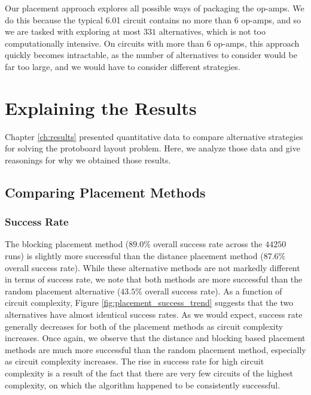 Our placement approach explores all possible ways
of packaging the op-amps. We do this because the typical 6.01 circuit contains
no more than $6$ op-amps, and so we are tasked with exploring at most $331$
alternatives, which is not too computationally intensive.
On circuits with more than $6$ op-amps, this approach quickly becomes
intractable, as the number of alternatives to consider would be
far too large, and we would have to consider different strategies.

\section{Explaining the Results}

Chapter \ref{ch:results} presented quantitative data to compare alternative
strategies for solving the protoboard layout problem. Here, we
analyze those data and give reasonings for why we obtained those results.

\subsection{Comparing Placement Methods}

\subsubsection{Success Rate}
The blocking placement method ($89.0\%$ overall success rate across the $44250$
runs)
is slightly more successful than the distance placement method ($87.6\%$ overall
success rate). While these alternative methods are not markedly different
in terms of success rate, we note that both methods are
more successful than the random placement alternative ($43.5\%$ overall success
rate).
As a function of circuit
complexity, Figure
\ref{fig:placement_success_trend} suggests that the two alternatives have almost
identical success rates. As we would expect, success rate generally decreases
for both of the placement methods as circuit complexity increases.
Once again, we observe that the distance and blocking based placement methods
are much more successful than the random placement method, especially as
circuit complexity increases.
The rise in success rate for high circuit complexity is a result of the fact
that there are very few circuits of the highest complexity, on which the
algorithm happened to be consistently successful.

